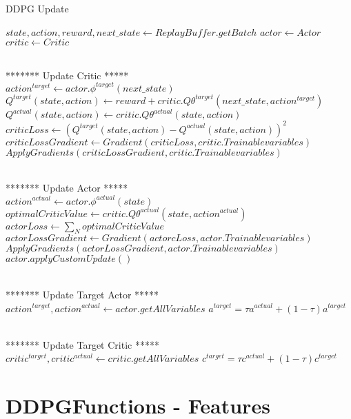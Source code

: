 \begin{algorithm}
\caption{DDPG Update}\label{alg:ddpg_update}
\begin{algorithmic}[1]
\State $state,action,reward,next\_state \gets ReplayBuffer.getBatch$
\State $actor \gets Actor$
\State $critic \gets Critic$

\State \\******* Update Critic  *****\\
\State $action^{target} \gets actor.\phi^{target}(next\_state)$ 
\State $Q^{target}(state,action) \gets reward + critic.Q\theta^{target}(next\_state,action^{target})$
\State $Q^{actual}(state,action) \gets critic.Q\theta^{actual}(state,action)$
\State $criticLoss \gets (Q^{target}(state,action)- Q^{actual}(state,action))^2$
\State $criticLossGradient \gets Gradient(criticLoss,critic.Trainablevariables)$
\State $ApplyGradients(criticLossGradient,critic.Trainablevariables)$

\State \\******* Update Actor  *****\\
    \State $action^{actual} \gets actor.\phi^{actual}(state)$
    \State $optimalCriticValue \gets critic.Q\theta^{actual}(state,action^{actual})$
    \State $actorLoss \gets \sum_N optimalCriticValue $ 
    \State $actorLossGradient \gets Gradient(actorcLoss,actor.Trainablevariables)$
    \State $ApplyGradients(actorLossGradient,actor.Trainablevariables)$
\Else
    \State $actor.applyCustomUpdate()$ 
\EndIf

\State \\******* Update Target Actor *****\\
\State $action^{target},action^{actual} \gets actor.getAllVariables$
        \State $a^{target} = \tau a^{actual}+(1-\tau)a^{target}$
\EndFor


\State \\******* Update Target Critic  *****\\
\State $critic^{target},critic^{actual} \gets critic.getAllVariables$
        \State $c^{target} = \tau c^{actual}+(1-\tau)c^{target}$
\EndFor
\end{algorithmic}
\end{algorithm}
\break


\section{DDPGFunctions - Features}


